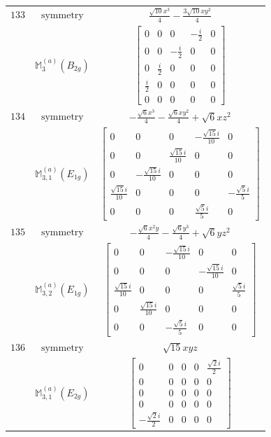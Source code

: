 \documentclass[fleqn,8pt,landscape]{jsarticle}
\begin{document}
\begin{longtable}{ccc}
$ 133 $ & $ \text{symmetry} $ & $ \frac{\sqrt{10} x^{3}}{4} - \frac{3 \sqrt{10} x y^{2}}{4} $ \\
$  $ & $ \mathbb{M}_{3}^{(a)}(B_{2g}) $ & $ \begin{bmatrix} 0 & 0 & 0 & - \frac{i}{2} & 0 \\ 0 & 0 & - \frac{i}{2} & 0 & 0 \\ 0 & \frac{i}{2} & 0 & 0 & 0 \\ \frac{i}{2} & 0 & 0 & 0 & 0 \\ 0 & 0 & 0 & 0 & 0 \end{bmatrix} $ \\ \hline
$ 134 $ & $ \text{symmetry} $ & $ - \frac{\sqrt{6} x^{3}}{4} - \frac{\sqrt{6} x y^{2}}{4} + \sqrt{6} x z^{2} $ \\
$  $ & $ \mathbb{M}_{3,1}^{(a)}(E_{1g}) $ & $ \begin{bmatrix} 0 & 0 & 0 & - \frac{\sqrt{15} i}{10} & 0 \\ 0 & 0 & \frac{\sqrt{15} i}{10} & 0 & 0 \\ 0 & - \frac{\sqrt{15} i}{10} & 0 & 0 & 0 \\ \frac{\sqrt{15} i}{10} & 0 & 0 & 0 & - \frac{\sqrt{5} i}{5} \\ 0 & 0 & 0 & \frac{\sqrt{5} i}{5} & 0 \end{bmatrix} $ \\ \hline
$ 135 $ & $ \text{symmetry} $ & $ - \frac{\sqrt{6} x^{2} y}{4} - \frac{\sqrt{6} y^{3}}{4} + \sqrt{6} y z^{2} $ \\
$  $ & $ \mathbb{M}_{3,2}^{(a)}(E_{1g}) $ & $ \begin{bmatrix} 0 & 0 & - \frac{\sqrt{15} i}{10} & 0 & 0 \\ 0 & 0 & 0 & - \frac{\sqrt{15} i}{10} & 0 \\ \frac{\sqrt{15} i}{10} & 0 & 0 & 0 & \frac{\sqrt{5} i}{5} \\ 0 & \frac{\sqrt{15} i}{10} & 0 & 0 & 0 \\ 0 & 0 & - \frac{\sqrt{5} i}{5} & 0 & 0 \end{bmatrix} $ \\ \hline
$ 136 $ & $ \text{symmetry} $ & $ \sqrt{15} x y z $ \\
$  $ & $ \mathbb{M}_{3,1}^{(a)}(E_{2g}) $ & $ \begin{bmatrix} 0 & 0 & 0 & 0 & \frac{\sqrt{2} i}{2} \\ 0 & 0 & 0 & 0 & 0 \\ 0 & 0 & 0 & 0 & 0 \\ 0 & 0 & 0 & 0 & 0 \\ - \frac{\sqrt{2} i}{2} & 0 & 0 & 0 & 0 \end{bmatrix} $ \\ \hline

\end{longtable}
\end{document}
